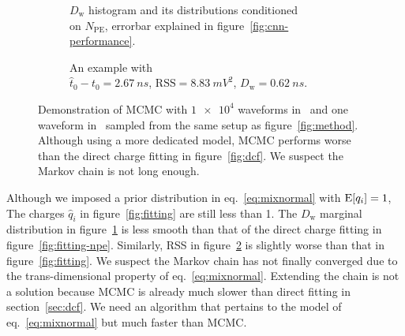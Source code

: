 \begin{figure}[H]
  \begin{subfigure}{.5\textwidth}
    \centering
    \resizebox{\textwidth}{!}{}
    \caption{\label{fig:mcmc-npe} $D_\mathrm{w}$ histogram and its distributions conditioned \\ on $N_{\mathrm{PE}}$, errorbar explained in figure~\ref{fig:cnn-performance}.}
  \end{subfigure}
  \begin{subfigure}{.5\textwidth}
    \centering
    \resizebox{\textwidth}{!}{}
    \caption{\label{fig:mcmc}An example with \\ $\hat{t}_0 - t_0=\SI{2.67}{ns}$, $\mathrm{RSS}=\SI{8.83}{mV^2}$, $D_\mathrm{w}=\SI{0.62}{ns}$.}
  \end{subfigure}
  \caption{\label{fig:mcmc-performance}Demonstration of MCMC with $\num[retain-unity-mantissa=false]{1e4}$ waveforms in~ and one waveform in~ sampled from the same setup as figure~\ref{fig:method}.  Although using a more dedicated model, MCMC performs worse than the direct charge fitting in figure~\ref{fig:dcf}. We suspect the Markov chain is not long enough.}
\end{figure}
Although we imposed a prior distribution in eq.~\eqref{eq:mixnormal} with $\operatorname{E}[q_i]=1$, The charges $\hat{q}_i$ in figure~\ref{fig:fitting} are still less than 1.  The $D_\mathrm{w}$ marginal distribution in figure~\ref{fig:mcmc-npe} is less smooth than that of the direct charge fitting in figure~\ref{fig:fitting-npe}.  Similarly, RSS in figure~\ref{fig:mcmc} is slightly worse than that in figure~\ref{fig:fitting}.  We suspect the Markov chain has not finally converged due to the trans-dimensional property of eq.~\eqref{eq:mixnormal}.  Extending the chain is not a solution because MCMC is already much slower than direct fitting in section~\ref{sec:dcf}.  We need an algorithm that pertains to the model of eq.~\eqref{eq:mixnormal} but much faster than MCMC.

